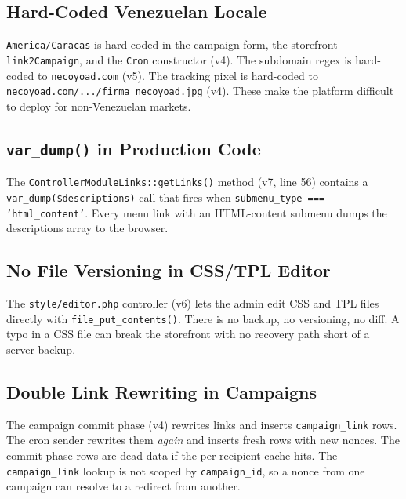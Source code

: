 \documentclass[11pt,a4paper]{article}
\begin{document}
\subsection{Hard-Coded Venezuelan Locale}

\begin{badbox}
\texttt{America/Caracas} is hard-coded in the campaign form, the
storefront \texttt{link2Campaign}, and the \texttt{Cron} constructor
(v4). The subdomain regex is hard-coded to \texttt{necoyoad.com}
(v5). The tracking pixel is hard-coded to
\texttt{necoyoad.com/.../firma\_necoyoad.jpg} (v4). These make the
platform difficult to deploy for non-Venezuelan markets.
\end{badbox}

\subsection{\texttt{var\_dump()} in Production Code}

\begin{badbox}
The \texttt{ControllerModuleLinks::getLinks()} method (v7, line 56)
contains a \texttt{var\_dump(\$descriptions)} call that fires when
\texttt{submenu\_type === 'html\_content'}. Every menu link with an
HTML-content submenu dumps the descriptions array to the browser.
\end{badbox}

\subsection{No File Versioning in CSS/TPL Editor}

\begin{badbox}
The \texttt{style/editor.php} controller (v6) lets the admin edit CSS
and TPL files directly with \texttt{file\_put\_contents()}. There is
no backup, no versioning, no diff. A typo in a CSS file can break the
storefront with no recovery path short of a server backup.
\end{badbox}

\subsection{Double Link Rewriting in Campaigns}

\begin{badbox}
The campaign commit phase (v4) rewrites links and inserts
\texttt{campaign\_link} rows. The cron sender rewrites them
\emph{again} and inserts fresh rows with new nonces. The commit-phase
rows are dead data if the per-recipient cache hits. The
\texttt{campaign\_link} lookup is not scoped by
\texttt{campaign\_id}, so a nonce from one campaign can resolve to a
redirect from another.
\end{badbox}
\end{document}
